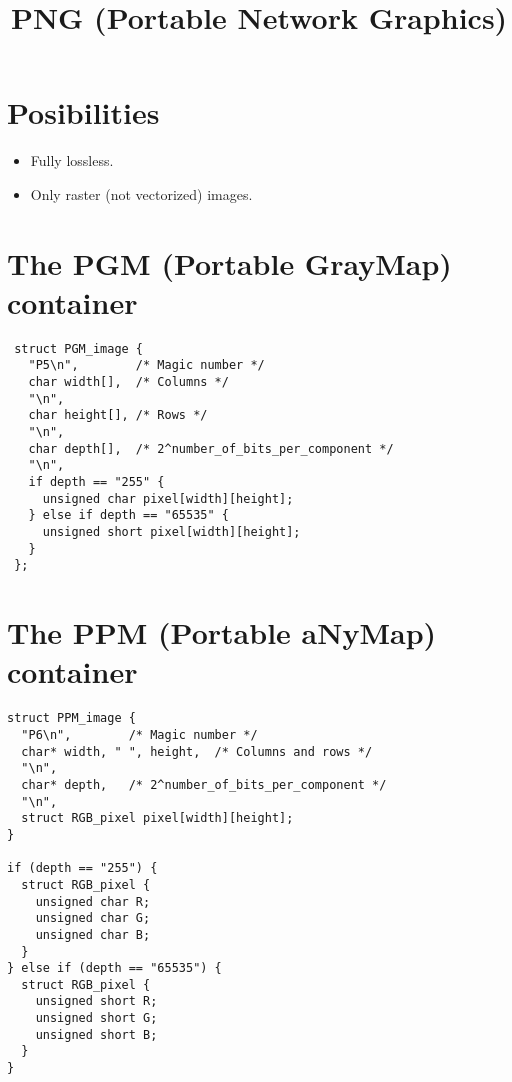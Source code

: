 \title{PNG (Portable Network Graphics)}

\maketitle
\tableofcontents

\section{Posibilities}
\begin{itemize}
\item Fully lossless.
\item Only raster (not vectorized) images.
\end{itemize} 



\section{The PGM (Portable GrayMap) container}
 \begin{verbatim}
 struct PGM_image {
   "P5\n",        /* Magic number */
   char width[],  /* Columns */
   "\n",
   char height[], /* Rows */
   "\n",
   char depth[],  /* 2^number_of_bits_per_component */
   "\n",
   if depth == "255" {
     unsigned char pixel[width][height];
   } else if depth == "65535" {
     unsigned short pixel[width][height];
   }
 };
 \end{verbatim}

\section{The PPM (Portable aNyMap) container}
\begin{verbatim}
struct PPM_image {
  "P6\n",        /* Magic number */
  char* width, " ", height,  /* Columns and rows */
  "\n",
  char* depth,   /* 2^number_of_bits_per_component */
  "\n",
  struct RGB_pixel pixel[width][height];
}

if (depth == "255") {
  struct RGB_pixel {
    unsigned char R;
    unsigned char G;
    unsigned char B;
  }
} else if (depth == "65535") {
  struct RGB_pixel {
    unsigned short R;
    unsigned short G;
    unsigned short B;
  }
}
\end{verbatim}


